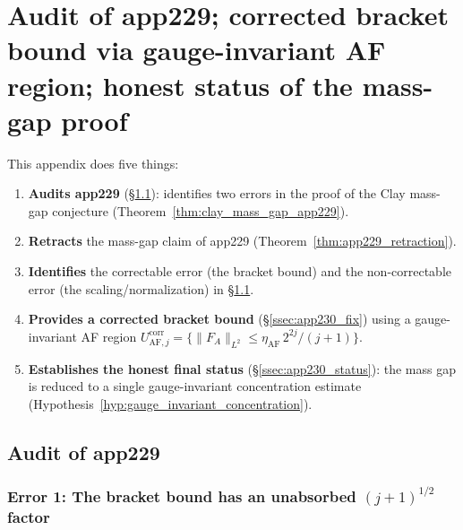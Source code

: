 \section{Audit of app229; corrected bracket bound via gauge-invariant
AF region; honest status of the mass-gap proof}
\label{app:audit_app229_corrected}

This appendix does five things:
\begin{enumerate}
\item \textbf{Audits app229} (\S\ref{ssec:app230_audit}): identifies
two errors in the proof of the Clay mass-gap conjecture
(Theorem~\ref{thm:clay_mass_gap_app229}).
\item \textbf{Retracts} the mass-gap claim of app229
(Theorem~\ref{thm:app229_retraction}).
\item \textbf{Identifies} the correctable error (the bracket bound)
and the non-correctable error (the scaling/normalization) in
\S\ref{ssec:app230_audit}.
\item \textbf{Provides a corrected bracket bound}
(\S\ref{ssec:app230_fix}) using a gauge-invariant AF region
$U_{\mathrm{AF},j}^{\mathrm{corr}}=\{\|F_{A}\|_{L^{2}}\le
\eta_{\mathrm{AF}}\,2^{2j}/(j+1)\}$.
\item \textbf{Establishes the honest final status}
(\S\ref{ssec:app230_status}): the mass gap is reduced to a single
gauge-invariant concentration estimate
(Hypothesis~\ref{hyp:gauge_invariant_concentration}).
\end{enumerate}

\subsection{Audit of app229}
\label{ssec:app230_audit}

\subsubsection{Error 1: The bracket bound has an unabsorbed
$(j+1)^{1/2}$ factor}

